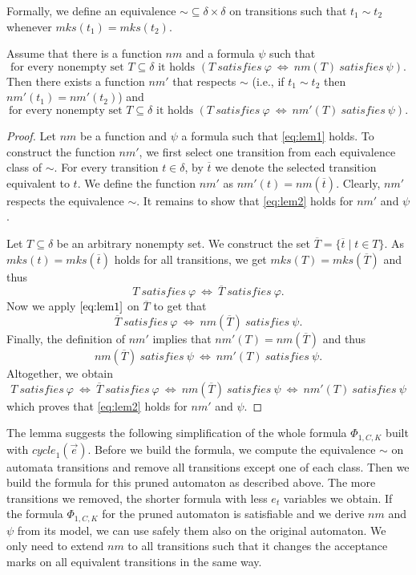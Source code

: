 \documentclass[a4paper,UKenglish,cleveref, autoref, thm-restate]{lipics-v2021}
\newcommand{\mks}{\mathit{mks}}
\newcommand{\rem}{\mathit{nm}}
\newcommand{\mcycle}{\mathit{cycle}}
\newcommand{\msat}{\mathit{satisfies}}
\begin{document}
Formally, we define an equivalence $\sim\subseteq\delta\times\delta$
on transitions such that $t_1\sim t_2$ whenever $\mks(t_1)=\mks(t_2)$.
\begin{lemma}
  Assume that there is a function $\rem$ and a formula $\psi$ such that 
  \[
    \textrm{for every nonempty set $T\subseteq\delta$ it holds }
      (T~\msat~\varphi~\iff~\rem(T)~\msat~\psi).\tag{$1$}\label{eq:lem1} 
  \]  
  Then there exists a function $\rem'$ that respects %
  $\sim$ (i.e.,
  if $t_1\sim t_2$ then $\rem'(t_1)=\rem'(t_2)$) and
  \[
    \textrm{for every nonempty set $T\subseteq\delta$ it holds }
    (T~\msat~\varphi~\iff~\rem'(T)~\msat~\psi).\tag{$2$}\label{eq:lem2} 
  \]  
\end{lemma}
\begin{proof}
  Let $\rem$ be a function and $\psi$ a formula such that
  \eqref{eq:lem1} holds. To construct the function $\rem'$, we first
  select one transition from each equivalence class of $\sim$. For
  every transition $t\in\delta$, by $\overline{t}$ we denote the
  selected transition equivalent to $t$. We define the function
  $\rem'$ as $\rem'(t)=\rem(\overline{t})$. Clearly, $\rem'$ respects
  the equivalence $\sim$. It remains to show that \eqref{eq:lem2}
  holds for $\rem'$ and $\psi$.

  Let $T\subseteq\delta$ be an arbitrary nonempty set. We construct
  the set $\overline{T}=\{\overline{t}\mid t\in T\}$. As
  $\mks(t)=\mks(\overline{t})$ holds for all transitions, we get
  $\mks(T)=\mks(\overline{T})$ and thus
  \[
    T~\msat~\varphi~\iff~\overline{T}~\msat~\varphi.
  \]
  Now we apply $\eqref{eq:lem1}$ on $\overline{T}$ to get that
  \[
    \overline{T}~\msat~\varphi~\iff~\rem(\overline{T})~\msat~\psi.
  \]
  Finally, the definition of $\rem'$ implies that
  $\rem'(T)=\rem(\overline{T})$ and thus
  \[
    \rem(\overline{T})~\msat~\psi~\iff~\rem'(T)~\msat~\psi.
  \]
  Altogether, we obtain
  \[
    T~\msat~\varphi~\iff~\overline{T}~\msat~\varphi~\iff~\rem(\overline{T})~\msat~\psi~\iff~\rem'(T)~\msat~\psi
  \]
  which proves that \eqref{eq:lem2} holds for $\rem'$ and $\psi$. 
\end{proof}

The lemma suggests the following simplification of the whole formula
$\Phi_{1,C,K}$ built with $\mcycle_1(\vec{e})$. Before we build the
formula, we compute the equivalence $\sim$ on automata transitions and
remove all transitions except one of each class. Then we build the
formula for this pruned automaton as described above. The more
transitions we removed, the shorter formula with less $e_t$ variables
we obtain. If the formula $\Phi_{1,C,K}$ for the pruned automaton is
satisfiable and we derive $\rem$ and $\psi$ from its model, we can use
safely them also on the original automaton. We only need to extend
$\rem$ to all transitions such that it changes the acceptance marks on
all equivalent transitions in the same way.
\end{document}
